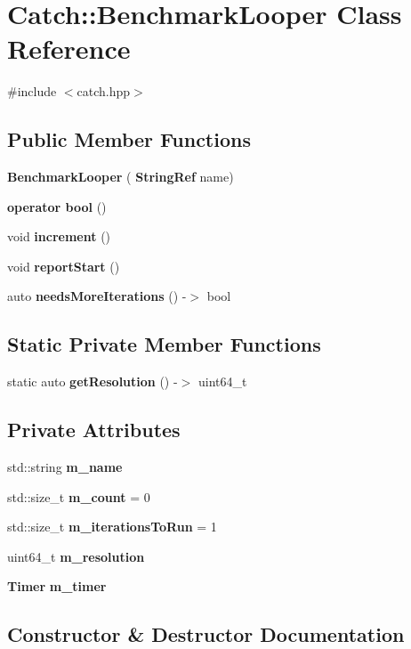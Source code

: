 \section{Catch\+::Benchmark\+Looper Class Reference}
\label{class_catch_1_1_benchmark_looper}


{\ttfamily \#include $<$catch.\+hpp$>$}

\subsection*{Public Member Functions}
\begin{DoxyCompactItemize}
\item 
\textbf{ Benchmark\+Looper} (\textbf{ String\+Ref} name)
\item 
\textbf{ operator bool} ()
\item 
void \textbf{ increment} ()
\item 
void \textbf{ report\+Start} ()
\item 
auto \textbf{ needs\+More\+Iterations} () -\/$>$ bool
\end{DoxyCompactItemize}
\subsection*{Static Private Member Functions}
\begin{DoxyCompactItemize}
\item 
static auto \textbf{ get\+Resolution} () -\/$>$ uint64\+\_\+t
\end{DoxyCompactItemize}
\subsection*{Private Attributes}
\begin{DoxyCompactItemize}
\item 
std\+::string \textbf{ m\+\_\+name}
\item 
std\+::size\+\_\+t \textbf{ m\+\_\+count} = 0
\item 
std\+::size\+\_\+t \textbf{ m\+\_\+iterations\+To\+Run} = 1
\item 
uint64\+\_\+t \textbf{ m\+\_\+resolution}
\item 
\textbf{ Timer} \textbf{ m\+\_\+timer}
\end{DoxyCompactItemize}


\subsection{Constructor \& Destructor Documentation}
\mbox{\label{class_catch_1_1_benchmark_looper_ab9ba6397306a70082f39e63a8a71bde6}} 
